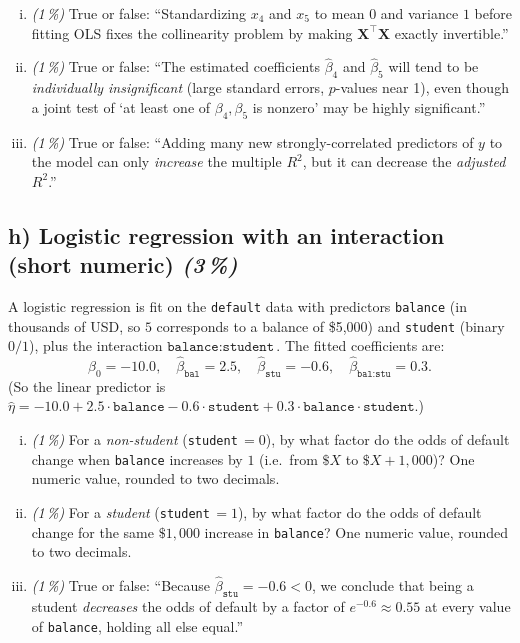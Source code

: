 \documentclass[11pt,a4paper]{article}
\newcommand{\subpoints}[1]{\textit{(#1\,\%)}}
\begin{document}
\begin{enumerate}[(i)]
  \item \subpoints{1} True or false: ``Standardizing $x_4$ and $x_5$ to mean $0$ and variance $1$ before fitting OLS fixes the collinearity problem by making $\mathbf{X}^\top\mathbf{X}$ exactly invertible.''
  \item \subpoints{1} True or false: ``The estimated coefficients $\hat\beta_4$ and $\hat\beta_5$ will tend to be \emph{individually insignificant} (large standard errors, $p$-values near 1), even though a joint test of `at least one of $\beta_4, \beta_5$ is nonzero' may be highly significant.''
  \item \subpoints{1} True or false: ``Adding many new strongly-correlated predictors of $y$ to the model can only \emph{increase} the multiple $R^2$, but it can decrease the \emph{adjusted} $R^2$.''
\end{enumerate}

\subsection*{h) Logistic regression with an interaction (short numeric) \subpoints{3}}

A logistic regression is fit on the \texttt{default} data with predictors \texttt{balance} (in thousands of USD, so $5$ corresponds to a balance of \$5,000) and \texttt{student} (binary $0/1$), plus the interaction $\texttt{balance}\!:\!\texttt{student}$. The fitted coefficients are:
$$\hat\beta_0 = -10.0, \quad \hat\beta_{\texttt{bal}} = 2.5, \quad \hat\beta_{\texttt{stu}} = -0.6, \quad \hat\beta_{\texttt{bal:stu}} = 0.3.$$
(So the linear predictor is $\hat\eta = -10.0 + 2.5\cdot\texttt{balance} - 0.6\cdot\texttt{student} + 0.3\cdot\texttt{balance}\cdot\texttt{student}$.)

\begin{enumerate}[(i)]
  \item \subpoints{1} For a \emph{non-student} (\texttt{student}\,$=0$), by what factor do the odds of default change when \texttt{balance} increases by $1$ (i.e.\ from $\$X$ to $\$X+1{,}000$)? One numeric value, rounded to two decimals.
  \item \subpoints{1} For a \emph{student} (\texttt{student}\,$=1$), by what factor do the odds of default change for the same $\$1{,}000$ increase in \texttt{balance}? One numeric value, rounded to two decimals.
  \item \subpoints{1} True or false: ``Because $\hat\beta_{\texttt{stu}} = -0.6 < 0$, we conclude that being a student \emph{decreases} the odds of default by a factor of $e^{-0.6}\approx 0.55$ at every value of \texttt{balance}, holding all else equal.''
\end{enumerate}
\end{document}
